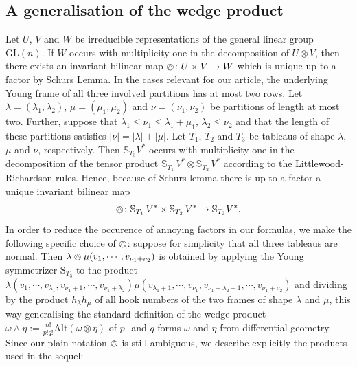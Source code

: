 \documentclass[11pt,a4paper]{article}
\theoremstyle{plain}
\theoremstyle{remark}
\newcommand{\GL}{\mathrm{GL}}
\newcommand{\rmS}{\mathrm{S}}
\newcommand{\bbS}{\mathbb{S}}
\begin{document}
\subsection{A generalisation of the wedge  product}
\label{se:product}
Let $U$, $V$ and $W$ be irreducible representations of the general linear
group $\GL(n)$. If $W$ occurs with multiplicity one in the decomposition of $U\otimes V$, then there exists an invariant bilinear map
$\owedge \colon U\times V \to W$ which is unique up to a factor by Schurs Lemma. In the cases relevant for our article,
the underlying Young frame of all three involved partitions has at most two
rows. Let $\lambda = (\lambda_1,\lambda_2)$, $\mu=(\mu_1,\mu_2)$  and $\nu =
(\nu_1,\nu_2)$ be partitions of length at most two. Further, suppose that
$\lambda_1 \leq \nu_1\leq \lambda_1 + \mu_1$, $\lambda_2\leq \nu_2$ and that the length of these partitions satisfies $|\nu|= |\lambda| + |\mu|$. 
Let $T_1$, $T_2$ and $T_3$ be tableaus of shape $\lambda$, $\mu$ and $\nu$, respectively.
Then $\bbS_{T_3}V^*$ occurs with multiplicity one in the decomposition of the tensor product 
$\bbS_{T_1}\,V^* \otimes \bbS_{T_2}\,V^*$ according to the
Littlewood-Richardson rules.  Hence, because of Schurs lemma there is up to
a factor a unique invariant bilinear map 
\begin{equation}
\owedge \colon \bbS_{T_1}\,V^* \times \bbS_{T_2}\,V^*\to \bbS_{T_3}V^*.
\end{equation}
In order to reduce the occurence of annoying factors in 
our formulas, we make the following specific choice of $\owedge$: suppose for simplicity that all three
tableaus are normal. %
Then $\lambda \owedge \mu(v_1,\cdots, v_{\nu_1 + \nu_2})$ is obtained by applying the Young symmetrizer
$\rmS_{T_3}$ to the product $\lambda(v_1,\cdots,v_{\lambda_1},v_{\nu_1+1},\cdots,v_{\nu_1 + \lambda_2})
\mu(v_{\lambda_1+1},\cdots, v_{\nu_1},v_{\nu_1 + \lambda_2 + 1},\cdots,v_{\nu_1 + \nu_2})$ 
and dividing by the product $h_\lambda h_\mu$ of all hook numbers of the two
frames of shape $\lambda$ and $\mu$, this way generalising the standard
definition of the wedge product $\omega\wedge \eta := \frac{n!}{p!q!} \mathrm{Alt}(\omega\otimes
\eta)$ of $p$- and $q$-forms $\omega$ and $\eta$ from
differential geometry. Since our plain notation $\owedge$ is still ambiguous, we describe explicitly the products used in the sequel:
\end{document}
